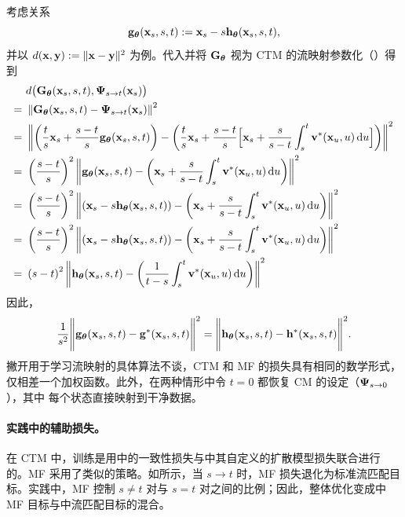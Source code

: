 考虑关系
\[
{\mathbf{g}}_{\bm{\theta}}({\mathbf{x}}_s,s,t) := {\mathbf{x}}_s - s {\mathbf{h}}_{\bm{\theta}}({\mathbf{x}}_s,s,t),
\]
并以 $d({\mathbf{x}},{\mathbf{y}}):=\|{\mathbf{x}}-{\mathbf{y}}\|^2$ 为例。代入并将 ${\mathbf{G}}_{\bm{\theta}}$ 视为 CTM 的流映射参数化（）得到
\begin{align} &~d\big({\mathbf{G}}_{\bm{\theta}}({\mathbf{x}}_s,s,t), {\bm{\Psi}}_{s\to t}({\mathbf{x}}_s)\big) \notag \\ = &~\left\lVert{\mathbf{G}}_{\bm{\theta}}({\mathbf{x}}_s,s,t) - {\bm{\Psi}}_{s\to t}({\mathbf{x}}_s)\right\rVert^2 \notag \\ = &~\left\lVert\left(\frac{t}{s}{\mathbf{x}}_s + \frac{s-t}{s} {\mathbf{g}}_{\bm{\theta}}({\mathbf{x}}_s,s,t)\right)-\left(\frac{t}{s}{\mathbf{x}}_s + \frac{s-t}{s}\Big[{\mathbf{x}}_s + \frac{s}{s-t}\int_s^t {\mathbf{v}}^*({\mathbf{x}}_u,u) \mathop{}\!\mathrm{d} u\Big]\right)\right\rVert^2 \notag \\ = &~\left(\frac{s-t}{s}\right)^2\left\lVert{\mathbf{g}}_{\bm{\theta}}({\mathbf{x}}_s,s,t)-\left({\mathbf{x}}_s + \frac{s}{s-t}\int_s^t {\mathbf{v}}^*({\mathbf{x}}_u,u) \mathop{}\!\mathrm{d} u\right)\right\rVert^2 \label{eq:g-para} \\ = &~\left(\frac{s-t}{s}\right)^2\left\lVert\left({\mathbf{x}}_s - s {\mathbf{h}}_{\bm{\theta}}({\mathbf{x}}_s,s,t)\right)-\left({\mathbf{x}}_s + \frac{s}{s-t}\int_s^t {\mathbf{v}}^*({\mathbf{x}}_u,u) \mathop{}\!\mathrm{d} u\right)\right\rVert^2 \notag \\ = &~\left(\frac{s-t}{s}\right)^2\left\lVert\left({\mathbf{x}}_s - s {\mathbf{h}}_{\bm{\theta}}({\mathbf{x}}_s,s,t)\right)-\left({\mathbf{x}}_s + \frac{s}{s-t}\int_s^t {\mathbf{v}}^*({\mathbf{x}}_u,u) \mathop{}\!\mathrm{d} u\right)\right\rVert^2 \notag \\ = &~\left(s-t\right)^2\left\lVert {\mathbf{h}}_{\bm{\theta}}({\mathbf{x}}_s,s,t)- \left(\frac{1}{t-s}\int_s^t {\mathbf{v}}^*({\mathbf{x}}_u,u)\mathop{}\!\mathrm{d} u \right)\right\rVert^2 \label{eq:h-para} \end{align}
 因此，
\begin{align*}
\frac{1}{s^2} \Bigg\|{\mathbf{g}}_{\bm{\theta}}({\mathbf{x}}_s,s,t)-{\mathbf{g}}^*({\mathbf{x}}_s,s,t) \Bigg\|^2 = \Bigg\|{\mathbf{h}}_{\bm{\theta}}({\mathbf{x}}_s,s,t)-{\mathbf{h}}^*({\mathbf{x}}_s,s,t) \Bigg\|^2.
\end{align*}
撇开用于学习流映射的具体算法不谈，CTM 和 MF 的损失具有相同的数学形式，仅相差一个加权函数。此外，在两种情形中令 $t=0$ 都恢复 CM 的设定（${\bm{\Psi}}_{s\to 0}$），其中
每个状态直接映射到干净数据。

\paragraph{实践中的辅助损失。}
在 CTM 中，训练是用中的一致性损失与中其自定义的扩散模型损失联合进行的。MF 采用了类似的策略。如所示，当 $s \to t$ 时，MF 损失退化为标准流匹配目标。实践中，MF 控制 $s \neq t$ 对与 $s = t$ 对之间的比例；因此，整体优化变成中 MF 目标与中流匹配目标的混合。

